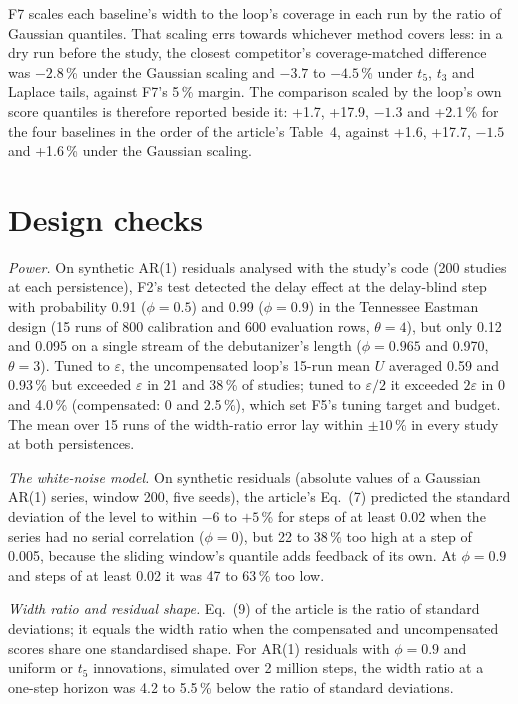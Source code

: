 \documentclass[10pt,a4paper]{article}
\begin{document}
F7 scales each baseline's width to the loop's coverage in each run by the ratio of Gaussian
quantiles. That scaling errs towards whichever method covers less: in a dry run before the study,
the closest competitor's coverage-matched difference was $-2.8$\,\% under the Gaussian scaling
and $-3.7$ to $-4.5$\,\% under $t_5$, $t_3$ and Laplace tails, against F7's 5\,\% margin. The
comparison scaled by the loop's own score quantiles is therefore reported beside it: +1.7,
+17.9, $-1.3$ and +2.1\,\% for the four baselines in the order of the article's Table~4, against
+1.6, +17.7, $-1.5$ and +1.6\,\% under the Gaussian scaling.

\section{Design checks}\label{sec:design}

\emph{Power.} On synthetic AR(1) residuals analysed with the study's code (200 studies at each
persistence), F2's test detected the delay effect at the delay-blind step with probability 0.91
($\phi = 0.5$) and 0.99 ($\phi = 0.9$) in the Tennessee Eastman design (15 runs of 800 calibration
and 600 evaluation rows, $\theta = 4$), but only 0.12 and 0.095 on a single stream of the
debutanizer's length ($\phi = 0.965$ and 0.970, $\theta = 3$). Tuned to $\varepsilon$, the
uncompensated loop's 15-run mean $U$ averaged 0.59 and 0.93\,\% but exceeded $\varepsilon$ in 21
and 38\,\% of studies; tuned to $\varepsilon/2$ it exceeded $2\varepsilon$ in 0 and 4.0\,\%
(compensated: 0 and 2.5\,\%), which set F5's tuning target and budget. The mean over 15 runs of
the width-ratio error lay within $\pm 10\,\%$ in every study at both persistences.

\emph{The white-noise model.} On synthetic residuals (absolute values of a Gaussian AR(1) series,
window 200, five seeds), the article's Eq.~(7) predicted the standard deviation of the level to
within $-6$ to $+5$\,\% for steps of at least 0.02 when the series had no serial correlation
($\phi = 0$), but 22 to 38\,\% too high at a step of 0.005, because the sliding window's quantile
adds feedback of its own. At $\phi = 0.9$ and steps of at least 0.02 it was 47 to 63\,\% too low.

\emph{Width ratio and residual shape.} Eq.~(9) of the article is the ratio of standard deviations;
it equals the width ratio when the compensated and uncompensated scores share one standardised
shape. For AR(1) residuals with $\phi = 0.9$ and uniform or $t_5$ innovations, simulated over 2
million steps, the width ratio at a one-step horizon was 4.2 to 5.5\,\% below the ratio of
standard deviations.
\end{document}
